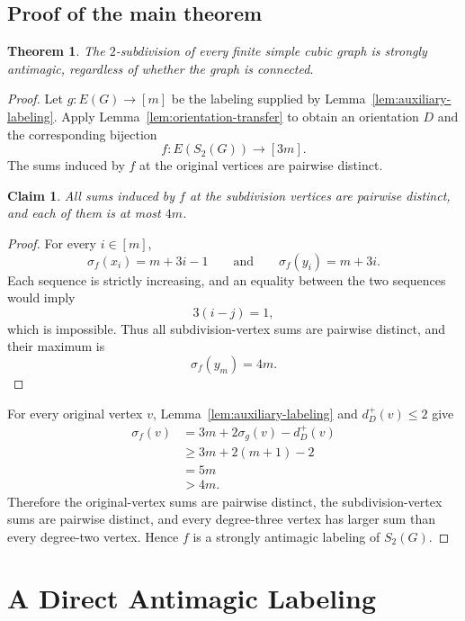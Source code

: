 \documentclass[preprint,12pt]{elsarticle}
\newtheorem{theorem}{Theorem}[section]
\newtheorem{claim}{Claim}[section]
\begin{document}
\subsection{Proof of the main theorem}
\label{subsec:proof-main-theorem}

\begin{theorem}
\label{thm:main}
The \(2\)-subdivision of every finite simple cubic graph is strongly
antimagic, regardless of whether the graph is connected.
\end{theorem}

\begin{proof}
Let \(g:E(G)\to[m]\) be the labeling supplied by
Lemma~\ref{lem:auxiliary-labeling}. Apply
Lemma~\ref{lem:orientation-transfer} to obtain an orientation \(D\) and
the corresponding bijection
\[
f:E(S_2(G))\longrightarrow[3m].
\]
The sums induced by \(f\) at the original vertices are pairwise distinct.

\begin{claim}
\label{clm:subdivision-vertex-sums}
All sums induced by \(f\) at the subdivision vertices are pairwise
distinct, and each of them is at most \(4m\).
\end{claim}

\begin{proof}
For every \(i\in[m]\),
\[
\sigma_f(x_i)=m+3i-1
\qquad\text{and}\qquad
\sigma_f(y_i)=m+3i.
\]
Each sequence is strictly increasing, and an equality between the two
sequences would imply
\[
3(i-j)=1,
\]
which is impossible. Thus all subdivision-vertex sums are pairwise
distinct, and their maximum is
\[
\sigma_f(y_m)=4m.
\]
\end{proof}

For every original vertex \(v\), Lemma~\ref{lem:auxiliary-labeling} and
\(d_D^+(v)\le2\) give
\[
\begin{aligned}
\sigma_f(v)
&=3m+2\sigma_g(v)-d_D^+(v)\\
&\ge3m+2(m+1)-2\\
&=5m\\
&>4m.
\end{aligned}
\]
Therefore the original-vertex sums are pairwise distinct, the
subdivision-vertex sums are pairwise distinct, and every degree-three
vertex has larger sum than every degree-two vertex. Hence \(f\) is a
strongly antimagic labeling of \(S_2(G)\).
\end{proof}


\section{A Direct Antimagic Labeling}
\label{sec:direct-labeling}
\end{document}
